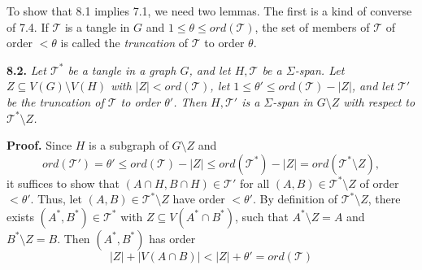 To show that 8.1 implies 7.1, we need two lemmas. The first is a kind of converse of 7.4. If $\mathcal{T}$ is a tangle in $G$ and $1 \le \theta \le ord(\mathcal{T})$, the set of members of $\mathcal{T}$ of order $< \theta$ is called the \textit{truncation} of $\mathcal{T}$ to order $\theta$.

\textbf{8.2.} \textit{Let $\mathcal{T}^*$ be a tangle in a graph $G$, and let $H, \mathcal{T}$ be a $\Sigma$-span. Let $Z \subseteq V(G) \setminus V(H)$ with $|Z| < ord(\mathcal{T})$, let $1 \le \theta' \le ord(\mathcal{T}) - |Z|$, and let $\mathcal{T}'$ be the truncation of $\mathcal{T}$ to order $\theta'$. Then $H, \mathcal{T}'$ is a $\Sigma$-span in $G \setminus Z$ with respect to $\mathcal{T}^* \setminus Z$.}

\textbf{Proof.} Since $H$ is a subgraph of $G \setminus Z$ and
\begin{equation*}
ord(\mathcal{T}') = \theta' \le ord(\mathcal{T}) - |Z| \le ord(\mathcal{T}^*) - |Z| = ord(\mathcal{T}^* \setminus Z),
\end{equation*}
it suffices to show that $(A \cap H, B \cap H) \in \mathcal{T}'$ for all $(A, B) \in \mathcal{T}^* \setminus Z$ of order $< \theta'$. Thus, let $(A, B) \in \mathcal{T}^* \setminus Z$ have order $< \theta'$. By definition of $\mathcal{T}^* \setminus Z$, there exists $(A^*, B^*) \in \mathcal{T}^*$ with $Z \subseteq V(A^* \cap B^*)$, such that $A^* \setminus Z = A$ and $B^* \setminus Z = B$. Then $(A^*, B^*)$ has order
\begin{equation*}
|Z| + |V(A \cap B)| < |Z| + \theta' = ord(\mathcal{T})
\end{equation*}
